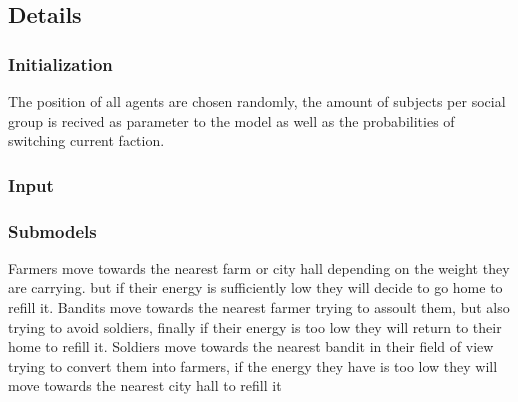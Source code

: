 \documentclass{wscpaperproc}
\theoremstyle{wsc}
\begin{document}
\subsection{Details}

\subsubsection{Initialization}

The position of all agents are chosen randomly, the amount of subjects per
social group is recived as parameter to the model as well as the probabilities
of switching current faction.

\subsubsection{Input}

\subsubsection{Submodels}

Farmers move towards the nearest farm or city hall depending on the weight they
are carrying. but if their energy is sufficiently low they will decide to go
home to refill it. Bandits move towards the nearest farmer trying to assoult
them, but also trying to avoid soldiers, finally if their energy is too low
they will return to their home to refill it. Soldiers move towards the nearest
bandit in their field of view trying to convert them into farmers, if the
energy they have is too low they will move towards the nearest city hall to
refill it



\end{document}

